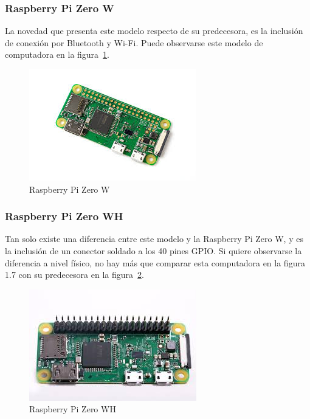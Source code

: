 \subsubsection{Raspberry Pi Zero W}

\noindent La novedad que presenta este modelo respecto de su predecesora, es la inclusión de conexión por Bluetooth y Wi-Fi. Puede observarse este modelo de computadora en la figura~\ref{fig:raspberry-pi-zero-w}.

\begin{figure}[tbp]
\centering
\includegraphics[scale = 1.2]{fig/Raspberry-Pi-Zero-W.jpg}
\caption{Raspberry Pi Zero W}
\label{fig:raspberry-pi-zero-w}
\end{figure}

\subsubsection{Raspberry Pi Zero WH}

\noindent Tan solo existe una diferencia entre este modelo y la Raspberry Pi  Zero W, y es la inclusión de un conector soldado a los 40 pines GPIO. Si quiere observarse la diferencia a nivel físico, no hay más que comparar esta computadora en la figura 1.7 con su predecesora en la figura~\ref{fig:raspberry-pi-zero-wh}.

\begin{figure}[tbp]
\centering
\includegraphics[scale = 0.8]{fig/Raspberry-Pi-Zero-WH.jpg}
\caption{Raspberry Pi Zero WH}
\label{fig:raspberry-pi-zero-wh}
\end{figure}

